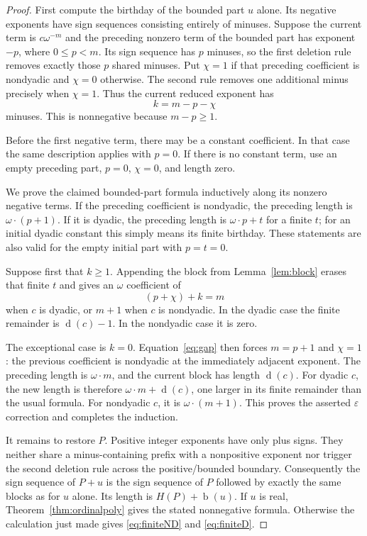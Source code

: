 \documentclass[11pt,letterpaper]{article}
\numberwithin{equation}{section}
\theoremstyle{definition}
\theoremstyle{remark}
\newcommand{\bd}{\operatorname{b}}
\newcommand{\rd}{\operatorname{d}}
\begin{document}
\begin{proof}
First compute the birthday of the bounded part $u$ alone. Its negative
exponents have sign sequences consisting entirely of minuses. Suppose the
current term is $c\omega^{-m}$ and the preceding nonzero term of the bounded
part has exponent $-p$, where $0\leq p<m$. Its sign sequence has $p$ minuses,
so the first deletion rule removes exactly those $p$ shared minuses. Put
$\chi=1$ if that preceding coefficient is nondyadic and $\chi=0$ otherwise.
The second rule removes one additional minus precisely when $\chi=1$.
Thus the current reduced exponent has
\begin{equation}\label{eq:gap}
 k=m-p-\chi
\end{equation}
minuses. This is nonnegative because $m-p\geq1$.

Before the first negative term, there may be a constant coefficient. In that
case the same description applies with $p=0$. If there is no constant term,
use an empty preceding part, $p=0$, $\chi=0$, and length zero.

We prove the claimed bounded-part formula inductively along its nonzero
negative terms. If the preceding coefficient is nondyadic, the preceding
length is $\omega\cdot(p+1)$. If it is dyadic, the preceding length is
$\omega\cdot p+t$ for a finite $t$; for an initial dyadic constant this simply
means its finite birthday. These statements are also valid for the empty
initial part with $p=t=0$.

Suppose first that $k\geq1$. Appending the block from
Lemma~\ref{lem:block} erases that finite $t$ and gives an $\omega$ coefficient
of
\[
 (p+\chi)+k=m
\]
when $c$ is dyadic, or $m+1$ when $c$ is nondyadic. In the dyadic case the
finite remainder is $\rd(c)-1$. In the nondyadic case it is zero.

The exceptional case is $k=0$. Equation~\eqref{eq:gap} then forces
$m=p+1$ and $\chi=1$: the previous coefficient is nondyadic at the immediately
adjacent exponent. The preceding length is $\omega\cdot m$, and the current
block has length $\rd(c)$. For dyadic $c$, the new length is therefore
$\omega\cdot m+\rd(c)$, one larger in its finite remainder than the usual
formula. For nondyadic $c$, it is $\omega\cdot(m+1)$. This proves the asserted
$\varepsilon$ correction and completes the induction.

It remains to restore $P$. Positive integer exponents have only plus signs.
They neither share a minus-containing prefix with a nonpositive exponent nor
trigger the second deletion rule across the positive/bounded boundary.
Consequently the sign sequence of $P+u$ is the sign sequence of $P$ followed
by exactly the same blocks as for $u$ alone. Its length is $H(P)+\bd(u)$.
If $u$ is real, Theorem~\ref{thm:ordinalpoly} gives the stated nonnegative
formula. Otherwise the calculation just made gives
\eqref{eq:finiteND} and \eqref{eq:finiteD}.
\end{proof}
\end{document}
